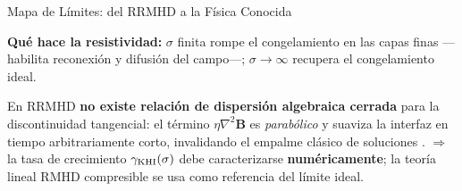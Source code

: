 \documentclass[aspectratio=169,9pt]{beamer}
\begin{document}
\begin{frame}{Mapa de L\'imites: del RRMHD a la F\'isica Conocida}
\begin{center}
\end{center}
\pause\vspace{0.02cm}
\begin{center}
  {\scriptsize\color{INF2}\textbf{Qu\'e hace la resistividad:} $\sigma$ finita
   rompe el congelamiento en las capas finas ---habilita reconexi\'on y
   difusi\'on del campo---; $\sigma\to\infty$ recupera el congelamiento ideal.}
\end{center}
\pause\vspace{0.02cm}
\begin{tcolorbox}[WRN={El punto que define este trabajo}]
  \scriptsize
  En RRMHD \textbf{no existe relaci\'on de dispersi\'on algebraica cerrada}
  para la discontinuidad tangencial: el t\'ermino $\eta\nabla^2\mathbf B$ es
  \emph{parab\'olico} y suaviza la interfaz en tiempo arbitrariamente corto,
  invalidando el empalme cl\'asico de soluciones \citep{palenzuela-2009}.
  $\Rightarrow$ la tasa de crecimiento $\gamma_{\rm KHI}(\sigma)$ debe
  caracterizarse \textbf{num\'ericamente}; la teor\'ia lineal RMHD
  compresible se usa como referencia del l\'imite ideal.
\end{tcolorbox}
\end{frame}
\end{document}
